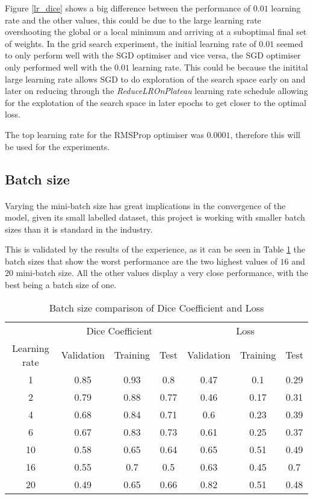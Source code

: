 Figure \ref{lr_dice} shows a big difference between the performance of $0.01$ learning rate and the other values, this could be due to the large learning rate overshooting the global or a local minimum and arriving at a suboptimal final set of weights.
In the grid search experiment, the initial learning rate of $0.01$ seemed to only perform well with the \gls{SGD} optimiser and vice versa, the \gls{SGD} optimiser only performed well with the $0.01$ learning rate. This could be because the initital large learning rate allows SGD to do exploration of the search space early on and later on reducing through the \textit{ReduceLROnPlateau} learning rate schedule allowing for the explotation of the search space in later epochs to get closer to the optimal loss.

The top learning rate for the RMSProp optimiser was $0.0001$, therefore this will be used for the experiments.

\subsection{Batch size}
\paragraph{}
Varying the mini-batch size has great implications in the convergence of the model, given its small labelled dataset, this project is working with smaller batch sizes than it is standard in the industry.

This is validated by the results of the experience, as it can be seen in Table \ref{tab_batch} the batch sizes that show the worst performance are the two highest values of $16$ and $20$ mini-batch size. All the other values display a very close performance, with the best being a batch size of one.

\begin{table}[ht!] 
    \begin{center}
    \begin{tabular}{ccccccc} 
    \toprule
       & \multicolumn{3}{c}{Dice Coefficient}     & \multicolumn{3}{c}{Loss} \\
    Learning rate & Validation & Training & Test & Validation & Training & Test \\ \midrule
    \rowcolor{lightgray} 1 & 0.85 & 0.93 & 0.8 & 0.47 & 0.1 & 0.29  \\ 2 & 0.79 & 0.88 & 0.77 & 0.46 & 0.17 & 0.31  \\ 4 & 0.68 & 0.84 & 0.71 & 0.6 & 0.23 & 0.39  \\ 6 & 0.67 & 0.83 & 0.73 & 0.61 & 0.25 & 0.37  \\ 10 & 0.58 & 0.65 & 0.64 & 0.65 & 0.51 & 0.49  \\ 16 & 0.55 & 0.7 & 0.5 & 0.63 & 0.45 & 0.7  \\ 20 & 0.49 & 0.65 & 0.66 & 0.82 & 0.51 & 0.48  \\
    \bottomrule
    \end{tabular}
  \end{center} 
  \caption{Batch size comparison of Dice Coefficient and Loss}\label{tab_batch}
\end{table}

